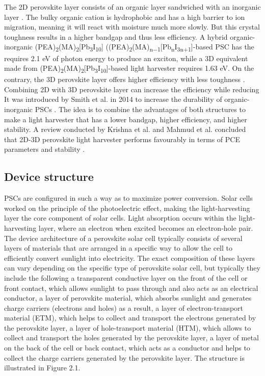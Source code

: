 The 2D perovskite layer consists of an organic layer sandwiched with an inorganic layer \cite{krishna_mixed_2019}. The bulky organic cation is hydrophobic and has a high barrier to ion migration, meaning it will react with moisture much more slowly. But this crystal toughness results in a higher bandgap and thus less efficiency. A hybrid organic-inorganic (PEA)\textsubscript{2}(MA)\textsubscript{2}[Pb\textsubscript{3}I\textsubscript{10}] ((PEA)\textsubscript{2}(MA)\textsubscript{n−1}[Pb\textsubscript{n}I\textsubscript{3n+1}]-based PSC has the requires 2.1 eV of photon energy to produce an exciton, while a 3D equivalent made from (PEA)\textsubscript{2}(MA)\textsubscript{2}[Pb\textsubscript{3}I\textsubscript{10}]-based light harvester requires 1.63 eV. On the contrary, the 3D perovskite layer offers higher efficiency with less toughness \cite{mahmud_origin_2022}. Combining 2D with 3D perovskite layer can increase the efficiency while reducing It was introduced by Smith et al. in 2014 to increase the durability of organic-inorganic PSCs \cite{smith_layered_2014}. The idea is to combine the advantages of both structures to make a light harvester that has a lower bandgap, higher efficiency, and higher stability. A review conducted by Krishna et al. and Mahmud et al. concluded that 2D-3D perovskite light harvester performs favourably in terms of PCE parameters and stability \cite{krishna_mixed_2019,mahmud_origin_2022}.
\par \subsection{Device structure}
PSCs are configured in such a way as to maximize power conversion. Solar cells worked on the principle of the photoelectric effect, making the light-harvesting layer the core component of solar cells. Light absorption occurs within the light-harvesting layer, where an electron when excited becomes an electron-hole pair.
The device architecture of a perovskite solar cell typically consists of several layers of materials that are arranged in a specific way to allow the cell to efficiently convert sunlight into electricity. The exact composition of these layers can vary depending on the specific type of perovskite solar cell, but typically they include the following a transparent conductive layer on the front of the cell or front contact, which allows sunlight to pass through and also acts as an electrical conductor, a layer of perovskite material, which absorbs sunlight and generates charge carriers (electrons and holes) as a result, a layer of electron-transport material (ETM), which helps to collect and transport the electrons generated by the perovskite layer, a layer of hole-transport material (HTM), which allows to collect and transport the holes generated by the perovskite layer, a layer of metal on the back of the cell or back contact, which acts as a conductor and helps to collect the charge carriers generated by the perovskite layer. The structure is illustrated in Figure 2.1.
